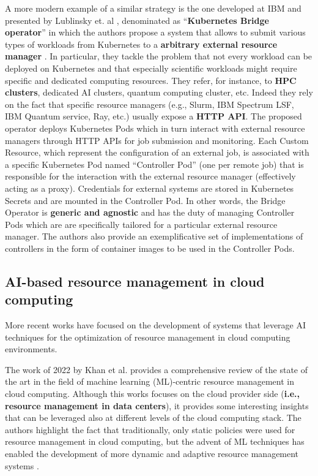 A more modern example of a similar strategy is the one developed at IBM and presented by Lublinsky et. al \cite{lublinsky2022kubernetesbridgeoperatorcloud}, denominated as ``\textbf{Kubernetes Bridge operator}'' in which the authors propose a system that allows to submit various types of workloads from Kubernetes to a \textbf{arbitrary external resource manager} .
In particular, they tackle the problem that not every workload can be deployed on Kubernetes and that especially scientific workloads might require specific and dedicated computing resources.
They refer, for instance, to \textbf{HPC clusters}, dedicated AI clusters, quantum computing cluster, etc.
Indeed they rely on the fact that specific resource managers (e.g., Slurm, IBM Spectrum LSF, IBM Quantum service, Ray, etc.) usually expose a \textbf{HTTP API}.
The proposed operator deploys Kubernetes Pods which in turn interact with external resource managers through HTTP APIs for job submission and monitoring.
Each Custom Resource, which represent the configuration of an external job, is associated with a specific Kubernetes Pod named ``Controller Pod'' (one per remote job) that is responsible for the interaction with the external resource manager (effectively acting as a proxy).
Credentials for external systems are stored in Kubernetes Secrets and are mounted in the Controller Pod.
In other words, the Bridge Operator is \textbf{generic and agnostic} and has the duty of managing Controller Pods which are are specifically tailored for a particular external resource manager.
The authors also provide an exemplificative set of implementations of controllers in the form of container images to be used in the Controller Pods.

\subsection{AI-based resource management in cloud computing}
\label{sec:ai_based_resource_management}

More recent works have focused on the development of systems that leverage AI techniques for the optimization of resource management in cloud computing environments.

The work of 2022 by Khan et al. \cite{KHAN2022103405} provides a comprehensive review of the state of the art in the field of machine learning (ML)-centric resource management in cloud computing.
Although this works focuses on the cloud provider side (\textbf{i.e., resource management in data centers}), it provides some interesting insights that can be leveraged also at different levels of the cloud computing stack.
The authors highlight the fact that traditionally, only static policies were used for resource management in cloud computing, but the advent of ML techniques has enabled the development of more dynamic and adaptive resource management systems \cite{KHAN2022103405}. \newline

